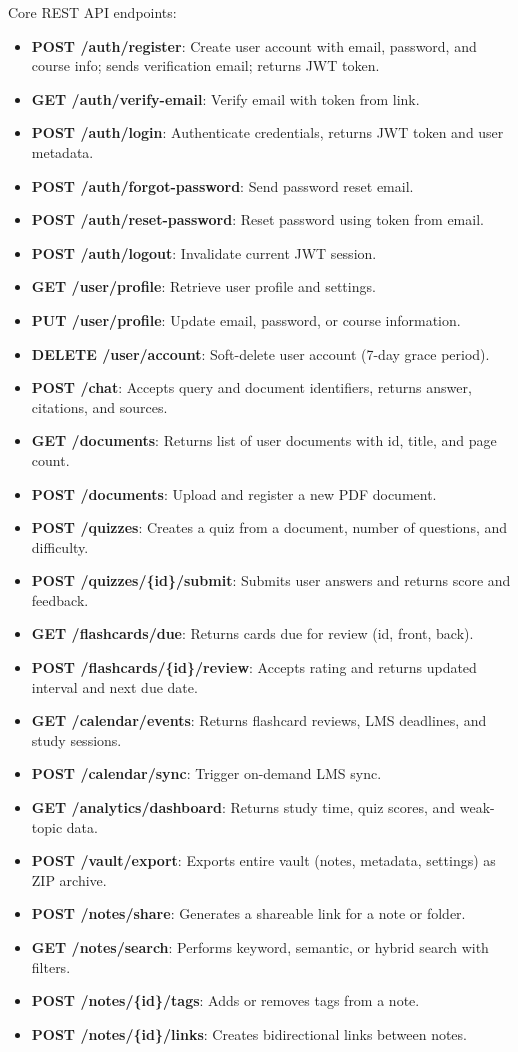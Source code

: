 \documentclass[12pt,a4paper]{article}
\begin{document}
Core REST API endpoints:

\begin{itemize}
    \item \textbf{POST /auth/register}: Create user account with email, password, and course info; sends verification email; returns JWT token.
    \item \textbf{GET /auth/verify-email}: Verify email with token from link.
    \item \textbf{POST /auth/login}: Authenticate credentials, returns JWT token and user metadata.
    \item \textbf{POST /auth/forgot-password}: Send password reset email.
    \item \textbf{POST /auth/reset-password}: Reset password using token from email.
    \item \textbf{POST /auth/logout}: Invalidate current JWT session.
    \item \textbf{GET /user/profile}: Retrieve user profile and settings.
    \item \textbf{PUT /user/profile}: Update email, password, or course information.
    \item \textbf{DELETE /user/account}: Soft-delete user account (7-day grace period).
    \item \textbf{POST /chat}: Accepts query and document identifiers, returns answer, citations, and sources.
    \item \textbf{GET /documents}: Returns list of user documents with id, title, and page count.
    \item \textbf{POST /documents}: Upload and register a new PDF document.
    \item \textbf{POST /quizzes}: Creates a quiz from a document, number of questions, and difficulty.
    \item \textbf{POST /quizzes/\{id\}/submit}: Submits user answers and returns score and feedback.
    \item \textbf{GET /flashcards/due}: Returns cards due for review (id, front, back).
    \item \textbf{POST /flashcards/\{id\}/review}: Accepts rating and returns updated interval and next due date.
    \item \textbf{GET /calendar/events}: Returns flashcard reviews, LMS deadlines, and study sessions.
    \item \textbf{POST /calendar/sync}: Trigger on-demand LMS sync.
    \item \textbf{GET /analytics/dashboard}: Returns study time, quiz scores, and weak-topic data.
    \item \textbf{POST /vault/export}: Exports entire vault (notes, metadata, settings) as ZIP archive.
    \item \textbf{POST /notes/share}: Generates a shareable link for a note or folder.
    \item \textbf{GET /notes/search}: Performs keyword, semantic, or hybrid search with filters.
    \item \textbf{POST /notes/\{id\}/tags}: Adds or removes tags from a note.
    \item \textbf{POST /notes/\{id\}/links}: Creates bidirectional links between notes.
\end{itemize}
\end{document}
